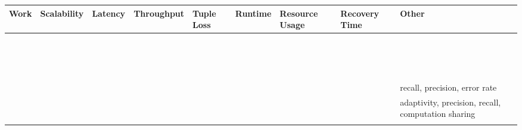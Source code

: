 \documentclass[ppgc,diss,english]{iiufrgs}
\begin{document}
\begin{table}[t]
\begin{center}
	\tiny
	\centering
	\begin{tabular}{ | l | c | c | c | >{\centering\arraybackslash}p{0.5cm} | c | >{\centering\arraybackslash}p{0.7cm} | >{\centering\arraybackslash}p{0.7cm} | >{\centering\arraybackslash}p{1.5cm} |}
   		\hline
        \textbf{Work} & \textbf{Scalability} & \textbf{Latency} & \textbf{Throughput} & \textbf{Tuple Loss} & \textbf{Runtime} & \textbf{Resource Usage} & \textbf{Recovery Time} & \textbf{Other} \\\hline
   		
		\cite{dayarathna2011performance} & \textbullet & & \textbullet & & & & & \\\hline
		\cite{dayarathna2013performance} & & & \textbullet & & & \textbullet & & \\\hline
		\cite{zaharia2012discretized} & \textbullet & & \textbullet & & \textbullet & & & \\\hline
		\cite{chauhan2012performance} & \textbullet & & \textbullet & \textbullet & & \textbullet & & \\\hline
		\cite{akidau2013millwheel} & \textbullet & \textbullet & & & & & & \\\hline
		\cite{qian2013timestream} & \textbullet & \textbullet & \textbullet & & & & \textbullet & \\\hline
		\cite{castro2013integrating} & & \textbullet & & & & & \textbullet & \\\hline
		\cite{de2011watershed} & & & \textbullet & & \textbullet & & & \\\hline
		\cite{gulisano2012streamcloud} & \textbullet & & \textbullet & & & \textbullet & & \\\hline
		\cite{chardonnens2013big} & & & & & \textbullet & & & \\\hline
		\cite{smit2013distributed} & \textbullet & \textbullet & \textbullet & & & & & \\\hline
		\cite{heinzeelastic} & & \textbullet & & & & & & \\\hline
		\cite{wahl2012performance} & & \textbullet & & & & \textbullet & & \\\hline
		\cite{le2012linked} & \textbullet & & \textbullet & & & & & \\\hline
		\cite{li2014cepben} & & \textbullet & \textbullet & & & & & \\\hline
		\cite{scharrenbach2013seven} & & \textbullet & \textbullet & & & & & recall, precision, error rate\\\hline
		\cite{bizarro2007bicep} & \textbullet & \textbullet & & & & & & adaptivity, precision, recall, computation sharing \\\hline
		\cite{lu2014stream} & \textbullet & \textbullet & \textbullet & & & & & \\\hline
		

\end{tabular}
\end{center}
\end{table}
\end{document}
